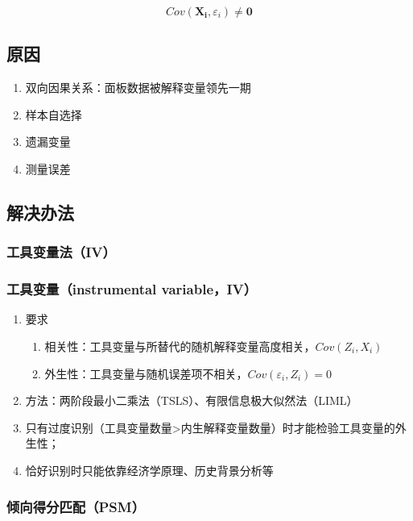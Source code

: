 \documentclass[12pt]{book}
\begin{document}
$$
Cov(\mathbf{X_i},\varepsilon_i)\neq\mathbf{0}
$$

\subsection{原因}

\begin{enumerate}[1.]
    \item 双向因果关系：面板数据被解释变量领先一期
    \item 样本自选择
    \item 遗漏变量
    \item 测量误差
\end{enumerate}


\subsection{解决办法}




\subsubsection{工具变量法（IV）}

\subsubsection{工具变量（instrumental variable，IV）}


\begin{enumerate}[1.]
    \item 要求
    \begin{enumerate}[(1)]
        \item 相关性：工具变量与所替代的随机解释变量高度相关，$Cov(Z_i,X_i)$  
        \item 外生性：工具变量与随机误差项不相关，$Cov(\varepsilon_i,Z_i)=0$  
    \end{enumerate}
    \item 方法：两阶段最小二乘法（TSLS）、有限信息极大似然法（LIML）
    \item 只有过度识别（工具变量数量>内生解释变量数量）时才能检验工具变量的外生性；  
    \item 恰好识别时只能依靠经济学原理、历史背景分析等
\end{enumerate}




\subsubsection{倾向得分匹配（PSM）}
\end{document}
